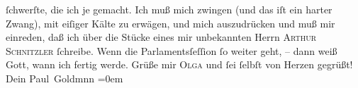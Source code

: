 \begin{ledgroupsized}[t]{13cm}
               ſchwerſte, die ich je gemacht. Ich muß mich zwingen (und das iſt ein harter Zwang),
               mit eiſiger Kälte zu erwägen, und mich auszudrücken und muß mir einreden, daß ich
               über die Stücke eines mir
               unbekannten Herrn \textsc{Arthur Schnitzler} ſchreibe. Wenn die
               Parlamentsſeſſion ſo weiter geht, – dann weiß Gott, wann ich fertig werde.\pend
           \pstart
           Grüße mir \textsc{Olga} und ſei ſelbſt von Herzen gegrüßt! {\\[\baselineskip]}Dein \spacefill\mbox{Paul Goldmnn}\pend
           \leftskip=0em{}
         
         \endnumbering{}\end{ledgroupsized}  \newcommand{\dateiname}{L03192}\newcommand{\titel}{Paul Goldmann an Arthur Schnitzler, 14. 1. [1902]}\newcommand{\editorInnen}{Martin Anton Müller und Laura Untner}
      